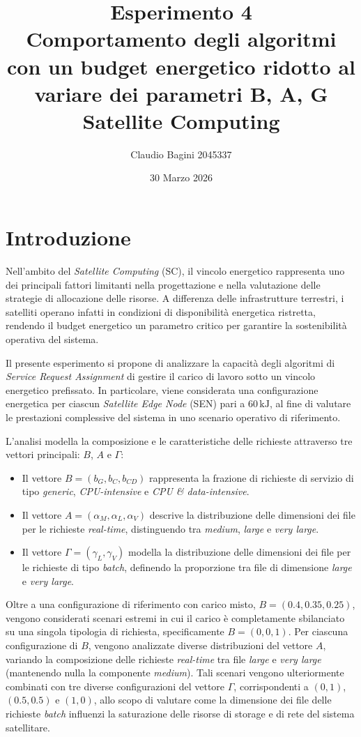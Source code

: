 \documentclass[12pt]{article}
\title{
\textbf{Esperimento 4} \\[0.5em]
\textbf{Comportamento degli algoritmi con un budget energetico ridotto al variare dei parametri B, A, G} \\[1em]
Satellite Computing
}
\author{Claudio Bagini 2045337}
\date{30 Marzo 2026}
\begin{document}
\maketitle

\section{Introduzione}

Nell'ambito del \textit{Satellite Computing} (SC), il vincolo energetico rappresenta uno dei principali fattori limitanti nella progettazione e nella valutazione delle strategie di allocazione delle risorse. A differenza delle infrastrutture terrestri, i satelliti operano infatti in condizioni di disponibilità energetica ristretta, rendendo il budget energetico un parametro critico per garantire la sostenibilità operativa del sistema. 

Il presente esperimento si propone di analizzare la capacità degli algoritmi di \textit{Service Request Assignment} di gestire il carico di lavoro sotto un vincolo energetico prefissato. In particolare, viene considerata una configurazione energetica per ciascun \textit{Satellite Edge Node} (SEN) pari a $60\,\mathrm{kJ}$, al fine di valutare le prestazioni complessive del sistema in uno scenario operativo di riferimento. 

L'analisi modella la composizione e le caratteristiche delle richieste attraverso tre vettori principali: $B$, $A$ e $\Gamma$:
\begin{itemize}
    \item Il vettore $B = (b_G, b_C, b_{CD})$ rappresenta la frazione di richieste di servizio di tipo \textit{generic}, \textit{CPU-intensive} e \textit{CPU \& data-intensive}.
    \item Il vettore $A = (\alpha_M, \alpha_L, \alpha_V)$ descrive la distribuzione delle dimensioni dei file per le richieste \textit{real-time}, distinguendo tra \textit{medium}, \textit{large} e \textit{very large}.
    \item Il vettore $\Gamma = (\gamma_L, \gamma_V)$ modella la distribuzione delle dimensioni dei file per le richieste di tipo \textit{batch}, definendo la proporzione tra file di dimensione \textit{large} e \textit{very large}.
\end{itemize}

Oltre a una configurazione di riferimento con carico misto, $B = (0.4, 0.35, 0.25)$, vengono considerati scenari estremi in cui il carico è completamente sbilanciato su una singola tipologia di richiesta, specificamente $B = (0,0,1)$. Per ciascuna configurazione di $B$, vengono analizzate diverse distribuzioni del vettore $A$, variando la composizione delle richieste \textit{real-time} tra file \textit{large} e \textit{very large} (mantenendo nulla la componente \textit{medium}). Tali scenari vengono ulteriormente combinati con tre diverse configurazioni del vettore $\Gamma$, corrispondenti a $(0,1)$, $(0.5,0.5)$ e $(1,0)$, allo scopo di valutare come la dimensione dei file delle richieste \textit{batch} influenzi la saturazione delle risorse di storage e di rete del sistema satellitare.
\end{document}
